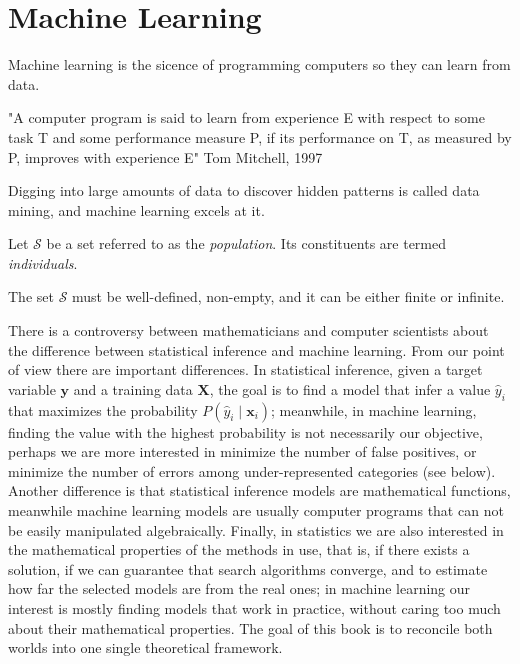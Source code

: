 \section{Machine Learning}
\label{sec:machine_learning}

{\color{red} Machine learning is the sicence of programming computers so they can learn from data.}

{\color{red} "A computer program is said to learn from experience E with respect to some task T and some performance measure P, if its performance on T, as measured by P, improves with experience E" Tom Mitchell, 1997}

{\color{red} Digging into large amounts of data to discover hidden patterns is called data mining, and machine learning excels at it.}


\begin{definition}
Let $\mathcal{S}$ be a set referred to as the \emph{population}. Its constituents are termed \emph{individuals}.
\end{definition}

The set $\mathcal{S}$ must be well-defined, non-empty, and it can be either finite or infinite. 




There is a controversy between mathematicians and computer scientists about the difference between statistical inference and machine learning. From our point of view there are important differences. In statistical inference, given a target variable $\mathbf{y}$ and a training data $\mathbf{X}$, the goal is to find a model that infer a value $\hat{y}_i$ that maximizes the probability $P(\hat{y}_i \mid \mathbf{x}_i)$; meanwhile, in machine learning, finding the value with the highest probability is not necessarily our objective, perhaps we are more interested in minimize the number of false positives, or minimize the number of errors among under-represented categories (see below). Another difference is that statistical inference models are mathematical functions, meanwhile machine learning models are usually computer programs that can not be easily manipulated algebraically. Finally, in statistics we are also interested in the mathematical properties of the methods in use, that is, if there exists a solution, if we can guarantee that search algorithms converge, and to estimate how far the selected models are from the real ones; in machine learning our interest is mostly finding models that work in practice, without caring too much about their mathematical properties. The goal of this book is to reconcile both worlds into one single theoretical framework.


